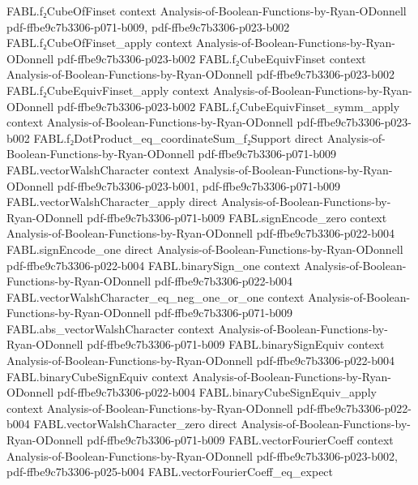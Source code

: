 \begin{theorem}
\proofstep
  {FABL.f₂CubeOfFinset}
  {context}
  {Analysis-of-Boolean-Functions-by-Ryan-ODonnell}
  {pdf-ffbe9c7b3306-p071-b009,
    pdf-ffbe9c7b3306-p023-b002}
\proofstep
  {FABL.f₂CubeOfFinset_apply}
  {context}
  {Analysis-of-Boolean-Functions-by-Ryan-ODonnell}
  {pdf-ffbe9c7b3306-p023-b002}
\proofstep
  {FABL.f₂CubeEquivFinset}
  {context}
  {Analysis-of-Boolean-Functions-by-Ryan-ODonnell}
  {pdf-ffbe9c7b3306-p023-b002}
\proofstep
  {FABL.f₂CubeEquivFinset_apply}
  {context}
  {Analysis-of-Boolean-Functions-by-Ryan-ODonnell}
  {pdf-ffbe9c7b3306-p023-b002}
\proofstep
  {FABL.f₂CubeEquivFinset_symm_apply}
  {context}
  {Analysis-of-Boolean-Functions-by-Ryan-ODonnell}
  {pdf-ffbe9c7b3306-p023-b002}
\proofstep
  {FABL.f₂DotProduct_eq_coordinateSum_f₂Support}
  {direct}
  {Analysis-of-Boolean-Functions-by-Ryan-ODonnell}
  {pdf-ffbe9c7b3306-p071-b009}
\proofstep
  {FABL.vectorWalshCharacter}
  {context}
  {Analysis-of-Boolean-Functions-by-Ryan-ODonnell}
  {pdf-ffbe9c7b3306-p023-b001,
    pdf-ffbe9c7b3306-p071-b009}
\proofstep
  {FABL.vectorWalshCharacter_apply}
  {direct}
  {Analysis-of-Boolean-Functions-by-Ryan-ODonnell}
  {pdf-ffbe9c7b3306-p071-b009}
\proofstep
  {FABL.signEncode_zero}
  {context}
  {Analysis-of-Boolean-Functions-by-Ryan-ODonnell}
  {pdf-ffbe9c7b3306-p022-b004}
\proofstep
  {FABL.signEncode_one}
  {direct}
  {Analysis-of-Boolean-Functions-by-Ryan-ODonnell}
  {pdf-ffbe9c7b3306-p022-b004}
\proofstep
  {FABL.binarySign_one}
  {context}
  {Analysis-of-Boolean-Functions-by-Ryan-ODonnell}
  {pdf-ffbe9c7b3306-p022-b004}
\proofstep
  {FABL.vectorWalshCharacter_eq_neg_one_or_one}
  {context}
  {Analysis-of-Boolean-Functions-by-Ryan-ODonnell}
  {pdf-ffbe9c7b3306-p071-b009}
\proofstep
  {FABL.abs_vectorWalshCharacter}
  {context}
  {Analysis-of-Boolean-Functions-by-Ryan-ODonnell}
  {pdf-ffbe9c7b3306-p071-b009}
\proofstep
  {FABL.binarySignEquiv}
  {context}
  {Analysis-of-Boolean-Functions-by-Ryan-ODonnell}
  {pdf-ffbe9c7b3306-p022-b004}
\proofstep
  {FABL.binaryCubeSignEquiv}
  {context}
  {Analysis-of-Boolean-Functions-by-Ryan-ODonnell}
  {pdf-ffbe9c7b3306-p022-b004}
\proofstep
  {FABL.binaryCubeSignEquiv_apply}
  {context}
  {Analysis-of-Boolean-Functions-by-Ryan-ODonnell}
  {pdf-ffbe9c7b3306-p022-b004}
\proofstep
  {FABL.vectorWalshCharacter_zero}
  {direct}
  {Analysis-of-Boolean-Functions-by-Ryan-ODonnell}
  {pdf-ffbe9c7b3306-p071-b009}
\proofstep
  {FABL.vectorFourierCoeff}
  {context}
  {Analysis-of-Boolean-Functions-by-Ryan-ODonnell}
  {pdf-ffbe9c7b3306-p023-b002,
    pdf-ffbe9c7b3306-p025-b004}
\proofstep
  {FABL.vectorFourierCoeff_eq_expect}

\end{theorem}
